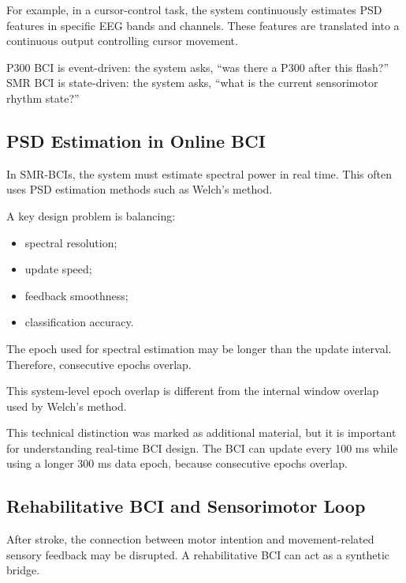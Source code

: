 For example, in a cursor-control task, the system continuously estimates PSD features in specific EEG bands and channels. These features are translated into a continuous output controlling cursor movement.

\begin{authornote}
P300 BCI is event-driven: the system asks, ``was there a P300 after this flash?'' SMR BCI is state-driven: the system asks, ``what is the current sensorimotor rhythm state?''
\end{authornote}

\subsection{PSD Estimation in Online BCI}

In SMR-BCIs, the system must estimate spectral power in real time. This often uses PSD estimation methods such as Welch's method.

A key design problem is balancing:

\begin{itemize}[noitemsep]
    \item spectral resolution;
    \item update speed;
    \item feedback smoothness;
    \item classification accuracy.
\end{itemize}

The epoch used for spectral estimation may be longer than the update interval. Therefore, consecutive epochs overlap.

This system-level epoch overlap is different from the internal window overlap used by Welch's method.

\begin{noexam}
This technical distinction was marked as additional material, but it is important for understanding real-time BCI design. The BCI can update every 100 ms while using a longer 300 ms data epoch, because consecutive epochs overlap.
\end{noexam}

\subsection{Rehabilitative BCI and Sensorimotor Loop}

After stroke, the connection between motor intention and movement-related sensory feedback may be disrupted. A rehabilitative BCI can act as a synthetic bridge.

